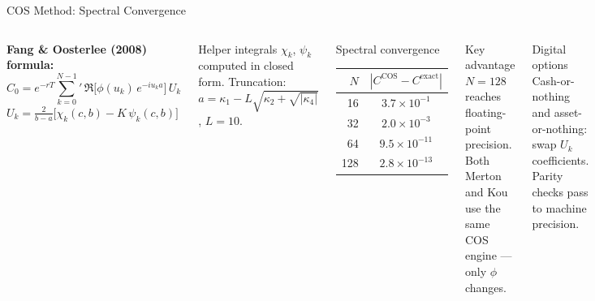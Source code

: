 \documentclass[aspectratio=169,10pt]{beamer}
\begin{document}
\begin{frame}{COS Method: Spectral Convergence}
\begin{columns}[T]
{\small\textbf{Fang \& Oosterlee (2008) formula:}}
\[
C_0 = e^{-rT}\sum_{k=0}^{N-1}{}' \,
\Re\!\bigl[\phi(u_k)\,e^{-iu_k a}\bigr]\,U_k
\]
{\footnotesize $U_k = \frac{2}{b-a}\bigl[\chi_k(c,b) - K\,\psi_k(c,b)\bigr]$}

\smallskip
{\footnotesize Helper integrals $\chi_k$, $\psi_k$ computed in closed form. Truncation: $a = \kappa_1 - L\sqrt{\kappa_2+\sqrt{|\kappa_4|}}$, $L=10$.}

\begin{block}{Spectral convergence}
\footnotesize
\begin{tabular}{rc}
\toprule
$N$ & $|C^{\text{COS}}-C^{\text{exact}}|$ \\
\midrule
 16  & $3.7\times10^{-1}$ \\
 32  & $2.0\times10^{-3}$ \\
 64  & $9.5\times10^{-11}$ \\
128  & $2.8\times10^{-13}$ \\
\bottomrule
\end{tabular}
\end{block}

\begin{alertblock}{Key advantage}
\footnotesize $N=128$ reaches floating-point precision. Both Merton and Kou use the same COS engine --- only $\phi$ changes.
\end{alertblock}

\begin{block}{Digital options}
\footnotesize Cash-or-nothing and asset-or-nothing: swap $U_k$ coefficients. Parity checks pass to machine precision.
\end{block}
\end{columns}
\end{frame}
\end{document}

